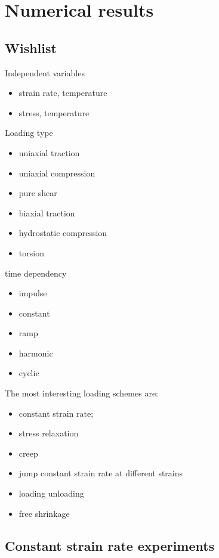 \chapter{Numerical results} \label{sec:numerical_results}

\section{Wishlist}

Independent variables
\begin{itemize}
  \item strain rate, temperature
  \item stress, temperature
\end{itemize}

Loading type
\begin{itemize}
  \item uniaxial traction
  \item uniaxial compression
  \item pure shear
  \item biaxial traction
  \item hydrostatic compression
  \item torsion
\end{itemize}

time dependency
\begin{itemize}
  \item impulse
  \item constant
  \item ramp
  \item harmonic
  \item cyclic
\end{itemize}

The most interesting loading schemes are:
\begin{itemize}
  \item constant strain rate;
  \item stress relaxation
  \item creep
  \item jump constant strain rate at different strains
  \item loading unloading
  \item free shrinkage
\end{itemize}


\section{Constant strain rate experiments}

